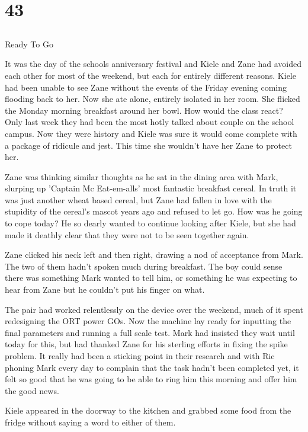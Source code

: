 \chapter{43}
\section{}
Ready To Go  

It was the day of the schools anniversary festival and Kiele and Zane had avoided each other for most of the weekend, but each for entirely different reasons.  Kiele had been unable to see Zane without the events of the Friday evening coming flooding back to her.  Now she ate alone, entirely isolated in her room.  She flicked the Monday morning breakfast around her bowl.  How would the class react?  Only last week they had been the most hotly talked about couple on the school campus.  Now they were history and Kiele was sure it would come complete with a package of ridicule and jest.  This time she wouldn't have her Zane to protect her.

Zane was thinking similar thoughts as he sat in the dining area with Mark, slurping up 'Captain Mc Eat-em-alls' most fantastic breakfast cereal.  In truth it was just another wheat based cereal, but Zane had fallen in love with the stupidity of the cereal's mascot years ago and refused to let go.  How was he going to cope today?  He so dearly wanted to continue looking after Kiele, but she had made it deathly clear that they were not to be seen together again.

Zane clicked his neck left and then right, drawing a nod of acceptance from Mark.  The two of them hadn't spoken much during breakfast.  The boy could sense there was something Mark wanted to tell him, or something he was expecting to hear from Zane but he couldn't put his finger on what.

The pair had worked relentlessly on the device over the weekend, much of it spent redesigning the ORT power GOs.  Now the machine lay ready for inputting the final parameters and running a full scale test.  Mark had insisted they wait until today for this, but had thanked Zane for his sterling efforts in fixing the spike problem.  It really had been a sticking point in their research and with Ric phoning Mark every day to complain that the task hadn't been completed yet, it felt so good that he was going to be able to ring him this morning and offer him the good news.

Kiele appeared in the doorway to the kitchen and grabbed some food from the fridge without saying a word to either of them.

